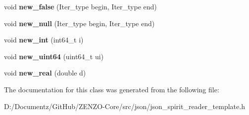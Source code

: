 \begin{DoxyCompactItemize}
void {\bfseries new\+\_\+false} (Iter\+\_\+type begin, Iter\+\_\+type end)
\item 
\mbox{\label{classjson__spirit_1_1_semantic__actions_aefab8e13244629e0a01d0c65be075269}} 
void {\bfseries new\+\_\+null} (Iter\+\_\+type begin, Iter\+\_\+type end)
\item 
\mbox{\label{classjson__spirit_1_1_semantic__actions_a5ff004592b45d14648c96af0e64a83e6}} 
void {\bfseries new\+\_\+int} (int64\+\_\+t i)
\item 
\mbox{\label{classjson__spirit_1_1_semantic__actions_a28b6759e6cb7fd662bd70c557600ccaf}} 
void {\bfseries new\+\_\+uint64} (uint64\+\_\+t ui)
\item 
\mbox{\label{classjson__spirit_1_1_semantic__actions_a9408c0e40cb12d465228be617ff1ac28}} 
void {\bfseries new\+\_\+real} (double d)
\end{DoxyCompactItemize}


The documentation for this class was generated from the following file\+:\begin{DoxyCompactItemize}
\item 
D\+:/\+Documentz/\+Git\+Hub/\+Z\+E\+N\+Z\+O-\/\+Core/src/json/json\+\_\+spirit\+\_\+reader\+\_\+template.\+h\end{DoxyCompactItemize}
